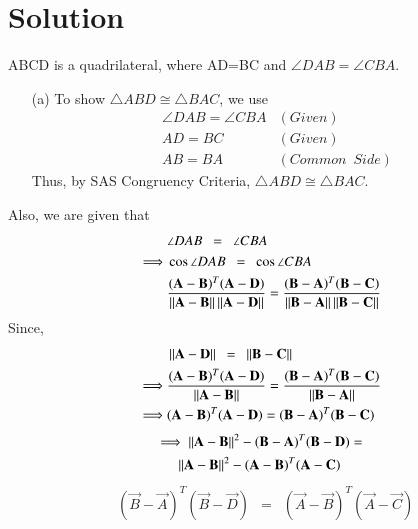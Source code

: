 \documentclass[journal,12pt,twocolumn]{IEEEtran}
\begin{document}
\section{Solution}
ABCD is a quadrilateral, where AD=BC and $\angle DAB= \angle CBA$.
\begin{enumerate}
\item[(a)] To show $\triangle ABD \cong \triangle BAC$, we use
\begin{align}
	& \angle DAB = \angle CBA & (Given) \\
	& AD = BC & (Given) \\
	& AB = BA & (Common \enspace Side)
\end{align}
Thus, by SAS Congruency Criteria, $\triangle ABD \cong \triangle BAC$.
\end{enumerate}
Also, we are given that
\begin{align}
 & \angle DAB \enspace = \enspace \angle CBA \\
 \implies &\cos\angle DAB \enspace = \enspace \cos\angle CBA \\
 &  \frac{(\mathbf A -\mathbf B)^T(\mathbf{A}-\mathbf{D})}{\left\lVert\mathbf{A}-\mathbf{B}\right\rVert \left\lVert\mathbf{A}-\mathbf{D}\right\rVert } = \frac{(\mathbf B -\mathbf A)^T(\mathbf{B}-\mathbf{C})}{\left\lVert\mathbf{B}-\mathbf{A}\right\rVert \left\lVert\mathbf{B}-\mathbf{C}\right\rVert}
 \end{align}
Since,
\begin{align}
	& \left\lVert\mathbf{A}-\mathbf{D}\right\rVert \enspace = \enspace \left\lVert\mathbf{B}-\mathbf{C}\right\rVert \\
	\implies & \frac{(\mathbf A -\mathbf B)^T(\mathbf{A}-\mathbf{D})}{\left\lVert\mathbf{A}-\mathbf{B}\right\rVert} = \frac{(\mathbf B -\mathbf A)^T(\mathbf{B}-\mathbf{C})}{\left\lVert\mathbf{B}-\mathbf{A}\right\rVert} \\
    \implies & (\mathbf A -\mathbf B)^T(\mathbf{A}-\mathbf{D}) =  (\mathbf B -\mathbf A)^T(\mathbf{B}-\mathbf{C})
\end{align}
\begin{multline}\label{2}
 \implies \left\lVert\mathbf{A}-\mathbf{B}\right\rVert^2 - (\mathbf B -\mathbf A)^T(\mathbf{B}-\mathbf{D})  =\\ \left\lVert\mathbf{A}-\mathbf{B}\right\rVert^2 - (\mathbf A -\mathbf B)^T(\mathbf{A}-\mathbf{C}) 
\end{multline}
\begin{align}
& (\vec B -\vec A)^T(\vec{B}-\vec{D}) \enspace = \enspace  (\vec A -\vec B)^T(\vec{A}-\vec{C})\label{1}
\end{align}
\end{document}
